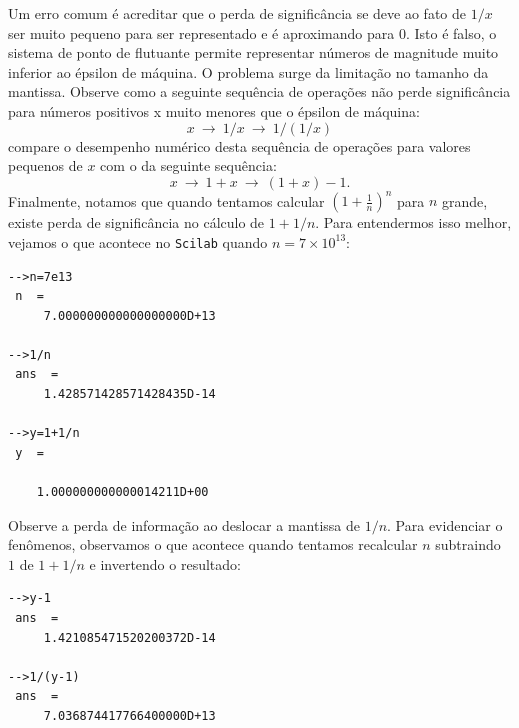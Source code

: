 Um erro comum é acreditar que o perda de significância se deve ao fato de $1/x$ ser muito pequeno para ser representado e é aproximando para $0$. Isto é falso, o sistema de ponto de flutuante permite representar números de magnitude muito inferior ao épsilon de máquina. O problema surge da limitação no tamanho da mantissa. Observe como a seguinte sequência de operações não perde significância para números positivos x muito menores que o épsilon de máquina:
\begin{equation}\label{seq_oper2}
x ~\to ~1/x ~\to ~1/(1/x) 
\end{equation}
 compare o desempenho numérico desta sequência de operações para valores pequenos de $x$ com o da seguinte sequência:
\begin{equation}\label{seq_oper3}
x ~\to ~1+x ~\to ~(1+x)-1.
\end{equation}
Finalmente, notamos que quando tentamos calcular $\left(1+\frac{1}{n}\right)^n$ para $n$ grande, existe perda de significância no cálculo de $1+1/n$. 
\ifisscilab
Para entendermos isso melhor, vejamos o que acontece no \verb+Scilab+ quando $n=7\times 10^{13}$:
\begin{verbatim}
-->n=7e13
 n  =
     7.000000000000000000D+13  
 
-->1/n
 ans  =
     1.428571428571428435D-14  
 
-->y=1+1/n
 y  =
 
    1.000000000000014211D+00  
\end{verbatim}
Observe a perda de informação ao deslocar a mantissa de $1/n$. Para evidenciar o fenômenos, observamos o que acontece quando tentamos recalcular $n$ subtraindo $1$ de $1+1/n$ e invertendo o resultado:
\begin{verbatim}
-->y-1
 ans  =
     1.421085471520200372D-14  
 
-->1/(y-1)
 ans  =
     7.036874417766400000D+13  
\end{verbatim}
\fi

